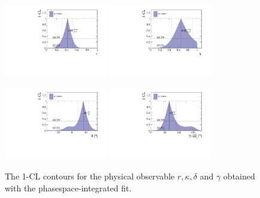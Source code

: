 \begin{figure}[h]
	\centering
		\includegraphics[width=0.4\textwidth, height = !]{figs/GammaCombo/signal/cartesian_cp_coeff_r.pdf} 
		\includegraphics[width=0.4\textwidth, height = !]{figs/GammaCombo/signal/cartesian_cp_coeff_k.pdf} 
		
		\includegraphics[width=0.4\textwidth, height = !]{figs/GammaCombo/signal/cartesian_cp_coeff_d.pdf} 
		\includegraphics[width=0.4\textwidth, height = !]{figs/GammaCombo/signal/cartesian_cp_coeff_g.pdf} 
		\caption{The 1-CL contours for the physical observable $r,\kappa,\delta$ and $\gamma$ obtained with the phasespace-integrated fit. }
		\label{fig:FitCL}	
\end{figure} 

